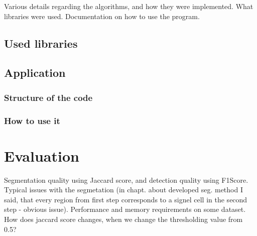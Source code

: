 \documentclass[
  digital,     %
  oneside,     %
  nosansbold,  %
  nocolorbold, %
  lof,         %
  lot,         %
]{fithesis4}
\begin{document}
Various details regarding the algorithms, and how they were implemented. What
libraries were used. Documentation on how to use the program.

\section{Used libraries}

\section{Application}

\subsection{Structure of the code}

\subsection{How to use it}

\chapter{Evaluation}
Segmentation quality using Jaccard score, and detection quality using F1Score.
Typical issues with the segmetation (in chapt. about developed seg. method I
said, that every region from first step corresponds to a signel cell in the
second step - obvious issue). Performance and memory requirements on some
dataset. How does jaccard score changes, when we change the thresholding value
from 0.5?
\end{document}
